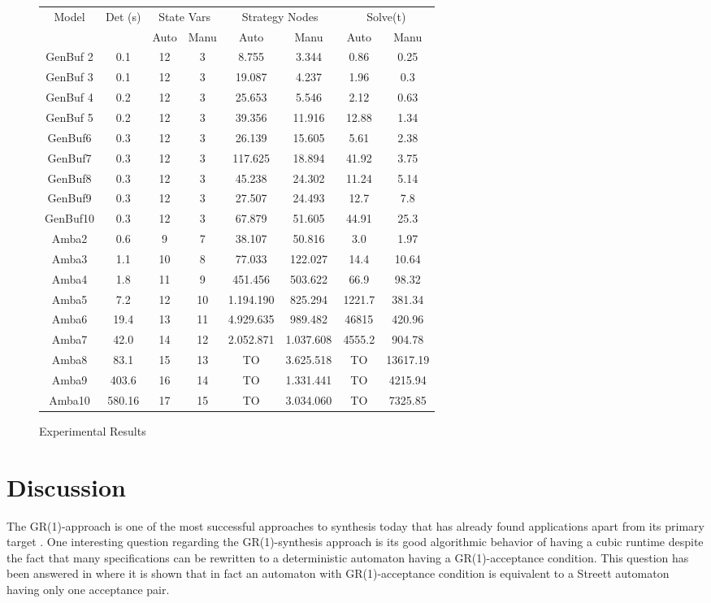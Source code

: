 \documentclass[submission,copyright,creativecommons]{eptcs}
\begin{document}
\begin{figure}[ht]
\centering
\begin{tabular}{|c|c|cc|cc|cc|}
	\hline
	Model & Det (s) & \multicolumn{2}{c|}{State Vars}& \multicolumn{2}{c|}{Strategy Nodes}& \multicolumn{2}{c|}{Solve(t)} \\
	& & Auto & Manu & Auto & Manu &Auto & Manu\\
	\hline
	GenBuf 2 & 0.1 & 12 & 3&8.755&3.344& 0.86 & 0.25\\
	GenBuf 3 & 0.1 & 12 &3&19.087&4.237& 1.96 & 0.3\\
	GenBuf 4 & 0.2 & 12 &3&25.653&5.546& 2.12 & 0.63\\
	GenBuf 5 & 0.2 &12 &3&39.356&11.916& 12.88 & 1.34\\
	GenBuf6 & 0.3 &12&3&26.139&15.605& 5.61 & 2.38\\
	GenBuf7 & 0.3 &12&3&117.625&18.894& 41.92 & 3.75\\
	GenBuf8 & 0.3 &12&3&45.238&24.302& 11.24 & 5.14\\
	GenBuf9 & 0.3 &12&3&27.507&24.493& 12.7 & 7.8\\
	GenBuf10 & 0.3 &12 &3&67.879&51.605& 44.91& 25.3\\
	Amba2 & 0.6 &9&7&38.107&50.816& 3.0 & 1.97\\
	Amba3 & 1.1 &10&8&77.033&122.027& 14.4& 10.64\\
	Amba4 & 1.8 &11&9&451.456&503.622& 66.9 & 98.32\\
	Amba5 & 7.2 &12&10&1.194.190&825.294& 1221.7 & 381.34\\
	Amba6 & 19.4 &13&11&4.929.635&989.482&  46815 & 420.96\\
	Amba7 & 42.0 &14&12&2.052.871&1.037.608&  4555.2 & 904.78 \\
	Amba8 &  83.1 &15&13&TO&3.625.518& TO & 13617.19\\
	Amba9 & 403.6 &16&14&TO&1.331.441& TO & 4215.94\\
	Amba10 & 580.16 &17&15&TO&3.034.060& TO & 7325.85\\
	\hline
\end{tabular}	
\caption{Experimental Results}
\label{fig:experiments}
\end{figure}



\section{Discussion}

The GR(1)-approach is one of the most successful approaches to \LTL{} synthesis today \cite{BGJP07,BGJP07a,JGWB07} that has already found applications apart from its primary target \cite{WoTM10}. One interesting question regarding the GR(1)-synthesis approach is its good algorithmic behavior of having a cubic runtime despite the fact that many specifications can be rewritten to a deterministic automaton having a GR(1)-acceptance condition. This question has been answered in \cite{BCGH10} where it is shown that in fact an automaton with GR(1)-acceptance condition is equivalent to a Streett automaton having only one acceptance pair. 
\end{document}
